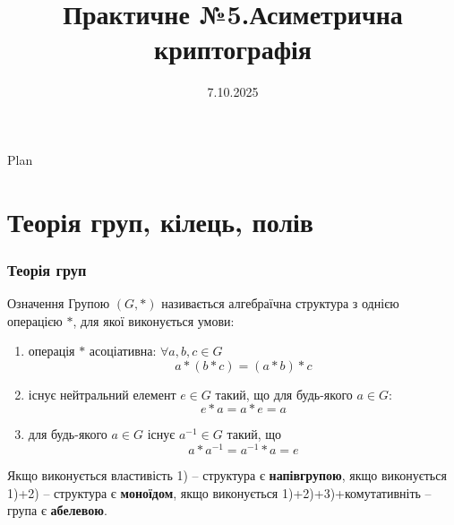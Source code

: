 \documentclass{../zkdl-presentation-template}
\title[Криптографія]{\textbf{Практичне №5.Асиметрична криптографія}}
\date{7.10.2025}
\begin{document}
    \frame{
        \titlepage
    }
  
    \begin{frame}{Plan}
        \tableofcontents
    \end{frame}

\section{Теорія груп, кілець, полів} %

\begin{frame}
    \frametitle{Теорія груп}
    \begin{block}{Означення}
        Групою $(G,*)$ називається алгебраїчна структура з однією операцією $*$, для якої виконується умови:
        \begin{enumerate}
            \item операція $*$ асоціативна: $\forall a,b,c\in G$
            \begin{equation*}
                a*(b*c)=(a*b)*c
            \end{equation*}
            \item існує нейтральний елемент $e\in G$ такий, що для будь-якого $a\in G$:
            \begin{equation*}
                e*a=a*e=a
            \end{equation*}
            \item для будь-якого $a\in G$ існує $a^{-1}\in G$ такий, що 
            \begin{equation*}
                a*a^{-1}=a^{-1}*a=e
            \end{equation*}
        \end{enumerate}
    \end{block}

    \vspace{-2mm}
    \begin{alertblock}{}
        Якщо виконується властивість 1) -- структура є \textbf{напівгрупою}, якщо виконується 1)+2) -- структура є \textbf{моноїдом}, якщо виконується 1)+2)+3)+комутативніть -- група є \textbf{абелевою}.
    \end{alertblock}
\end{frame}
\end{document}
